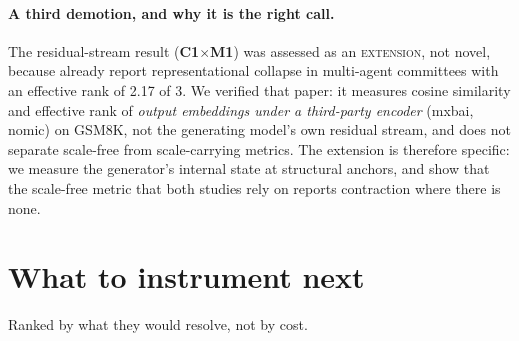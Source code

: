 \documentclass[10pt,a4paper]{article}
\newcommand{\ax}[1]{\textcolor{accent}{\textbf{#1}}}
\newcommand{\mx}[1]{\textbf{#1}}
\newcommand{\vext}{\textsc{extension}}
\begin{document}
\paragraph{A third demotion, and why it is the right call.} The residual-stream result (\ax{C1}$\times$\mx{M1}) was assessed as an \vext, not novel, because \citet{patel2026collapse} already report representational collapse in multi-agent committees with an effective rank of 2.17 of 3. We verified that paper: it measures cosine similarity and effective rank of \emph{output embeddings under a third-party encoder} (mxbai, nomic) on GSM8K, not the generating model's own residual stream, and does not separate scale-free from scale-carrying metrics. The extension is therefore specific: we measure the generator's internal state at structural anchors, and show that the scale-free metric that both studies rely on reports contraction where there is none.

\section{What to instrument next}\label{sec:followups}

Ranked by what they would resolve, not by cost.
\end{document}
